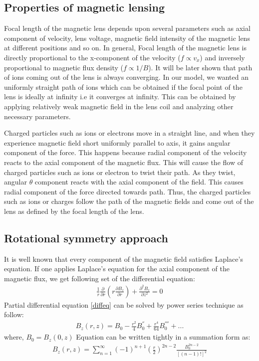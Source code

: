 \documentclass[twocolumn,12pt]{article}
\numberwithin{equation}{section} %
\numberwithin{equation}{section}
\begin{document}
\subsection{Properties of magnetic lensing}
Focal length of the magnetic lens depends upon several parameters such as axial component of velocity, lens voltage, magnetic field intensity of the magnetic lens at different positions and so on. In general, Focal length of the magnetic lens is directly proportional to the x-component of the velocity ($f \propto v_x$) and inversely proportional to magnetic flux density ($ f  \propto 1/ B$).\cite{designmaglens} It will be later shown that path of ions coming out of the lens is always converging. In our model, we wanted an uniformly straight path of ions which can be obtained if the focal point of the lens is ideally at infinity i.e it converges at infinity. This can be obtained by applying relatively weak magnetic field in the lens coil and analyzing other necessary parameters. 


Charged particles such as ions or electrons move in a straight line, and when they experience magnetic field short uniformly parallel to axis, it gains angular component of the force. This happens because radial component of the velocity reacts to the axial component of the magnetic flux. This will cause the flow of charged particles such as ions or electron to twist their path. As they twist, angular $\theta$ component reacts with the axial component of the field. This causes radial component of the force directed towards path. Thus, the charged particles such as ions or charges follow the path of the magnetic fields and come out of the lens as defined by the focal length of the lens. \cite{maglenstheory}

\subsection{Rotational symmetry approach}
It is well known that every component of the magnetic field satisfies Laplace's equation. If one applies Laplace's equation for the axial component of the magnetic flux, we get following set of the differential equation:
\begin{align}
    \frac{1}{r} \frac{\partial }{\partial r} \left (r \frac{\partial B_z}{\partial r} \right )+ \frac {\partial ^2 B_z}{\partial z^2}=0
    \label{diffeq}
\end{align}
Partial differential equation \ref{diffeq} can be solved by power series technique as follow:
\begin{align}
    B_z(r,z)= B_0- \frac{r^2}{4}B_0^{''}+ \frac{r^4}{64}B_0^{''''}+ ...
    \label{powerseries}
\end{align}
where, $B_0=B_z(0,z)$
Equation \label{powerseries} can be written tightly in a summation form as:
\begin{align}
    B_z(r,z)=\sum_{n=1}^\infty (-1)^{n+1} \left(\frac {r}{2} \right)^{2n-2} \frac{B_0^{2n-2}}{[(n-1)!]^2}
\end{align}
\end{document}
